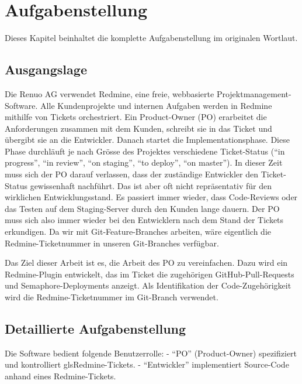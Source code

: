 \chapter{Aufgabenstellung}

Dieses Kapitel beinhaltet die komplette Aufgabenstellung im originalen Wortlaut.

\section{Ausgangslage}

Die Renuo AG verwendet \gls{Redmine}, eine freie, webbasierte Projektmanagement-Software. Alle Kundenprojekte und internen Aufgaben werden in Redmine mithilfe von \gls{Ticket}s orchestriert. Ein Product-Owner (PO) erarbeitet die Anforderungen zusammen mit dem Kunden, schreibt sie in das Ticket und übergibt sie an die Entwickler. Danach startet die Implementationsphase. Diese Phase durchläuft je nach Grösse des Projektes verschiedene Ticket-Status (\enquote{in progress}, \enquote{in review}, \enquote{on staging}, \enquote{to deploy}, \enquote{on master}). In dieser Zeit muss sich der PO darauf verlassen, dass der zuständige Entwickler den Ticket-Status gewissenhaft nachführt. Das ist aber oft nicht repräsentativ für den wirklichen Entwicklungsstand. Es passiert immer wieder, dass Code-Reviews oder das Testen auf dem Staging-Server durch den Kunden lange dauern. Der PO muss sich also immer wieder bei den Entwicklern nach dem Stand der Tickets erkundigen. Da wir mit Git-Feature-Branches arbeiten, wäre eigentlich die Redmine-Ticketnummer in unseren Git-Branches verfügbar.

Das Ziel dieser Arbeit ist es, die Arbeit des PO zu vereinfachen. Dazu wird ein Redmine-Plugin entwickelt, das im Ticket die zugehörigen GitHub-Pull-Requests und Semaphore-Deployments anzeigt. Als Identifikation der Code-Zugehörigkeit wird die Redmine-Ticketnummer im Git-Branch verwendet.

\section{Detaillierte Aufgabenstellung}

Die Software bedient folgende Benutzerrolle: \newline
- \enquote{PO} (Product-Owner) spezifiziert und kontrolliert gls{Redmine-Ticket}s. \newline
- \enquote{Entwickler} implementiert Source-Code anhand eines Redmine-Tickets. \newline

